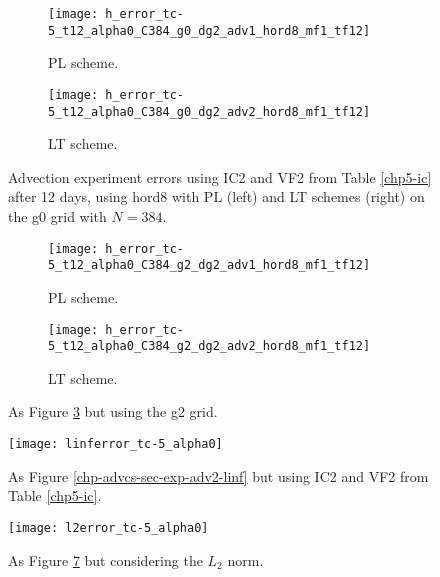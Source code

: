 \newpage
\begin{figure}[!htb]
	\centering
	\begin{subfigure}{0.45\textwidth}
		\centering
		\texttt{[image: h\_error\_tc-5\_t12\_alpha0\_C384\_g0\_dg2\_adv1\_hord8\_mf1\_tf12]}
		\caption{PL scheme.\label{chp-advcs-sec-exp-adv3-errors-0a}}
	\end{subfigure}
	\begin{subfigure}{0.45\textwidth}
		\centering
		\texttt{[image: h\_error\_tc-5\_t12\_alpha0\_C384\_g0\_dg2\_adv2\_hord8\_mf1\_tf12]}
		\caption{LT scheme.\label{chp-advcs-sec-exp-adv3-errors-0b}}
	\end{subfigure}
	\caption{
		Advection experiment errors using IC2 and VF2 from Table \ref{chp5-ic} after 12 days, using hord8
		with PL (left) and LT schemes (right) on the g0 grid with $N=384$. 
		 \label{chp-advcs-sec-exp-adv3-errors-0}}
\end{figure}
\begin{figure}[!htb]
	\centering
	\begin{subfigure}{0.45\textwidth}
		\centering
		\texttt{[image: h\_error\_tc-5\_t12\_alpha0\_C384\_g2\_dg2\_adv1\_hord8\_mf1\_tf12]}
		\caption{PL scheme.\label{chp-advcs-sec-exp-adv3-errors-2a}}
	\end{subfigure}
	\begin{subfigure}{0.45\textwidth}
		\centering
		\texttt{[image: h\_error\_tc-5\_t12\_alpha0\_C384\_g2\_dg2\_adv2\_hord8\_mf1\_tf12]}
		\caption{LT scheme.\label{chp-advcs-sec-exp-adv3-errors-2b}}
	\end{subfigure}
	\caption{As Figure \ref{chp-advcs-sec-exp-adv3-errors-0} but using the g2 grid.\label{chp-advcs-sec-exp-adv3-errors-2}}
\end{figure}


\newpage
\begin{figure}[!htb]
	\centering
	\texttt{[image: linferror\_tc-5\_alpha0]}
	\caption{As Figure \ref{chp-advcs-sec-exp-adv2-linf} but using  IC2 and VF2 from Table \ref{chp5-ic}.\label{chp-advcs-sec-exp-adv3-linf}}
\end{figure}

\begin{figure}[!htb]
	\centering
	\texttt{[image: l2error\_tc-5\_alpha0]}
	\caption{As Figure \ref{chp-advcs-sec-exp-adv3-linf} but considering the $L_2$ norm. \label{chp-advcs-sec-exp-adv3-error}}
\end{figure}


\newpage
